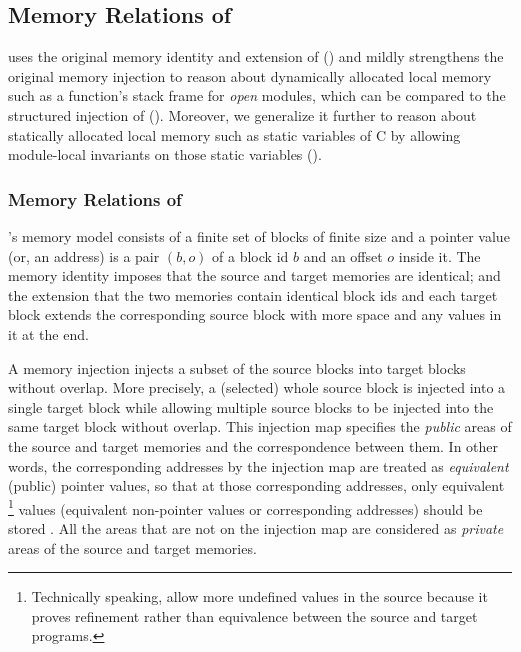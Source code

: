 {\revisioncmd
\subsection{Memory Relations of \ccm{}}
\label{sec:overview-verification:injection}

\ccm{} uses the original memory identity and extension of \cc{}
() and mildly
strengthens the original memory injection to reason about dynamically allocated
local memory such as a function's stack frame for \emph{open} modules,
which can be compared to the structured injection of \ccc{}
().
Moreover, we generalize it further to reason about statically allocated local memory
such as static variables of C by allowing module-local invariants on those static variables
().


\subsubsection{Memory Relations of \cc{}}
\label{sec:overview-verification:injection:original}
%
\cc{}'s memory model consists of a finite set of blocks of finite size
and a pointer value (or, an address) is a pair $(b,o)$ of a block id $b$ and an offset $o$ inside it.
The memory identity imposes that the source and target memories are identical;
and the extension that the two memories contain identical block ids and
each target block extends the corresponding source block
with more space and any values in it at the end.

A memory injection injects a subset of the source blocks into target blocks
without overlap. More precisely, a (selected) whole source block is injected into a single target block
while allowing multiple source blocks to be injected into the same target block without overlap.
This injection map specifies the \emph{public} areas of the source and target memories and the correspondence between them.
In other words, the corresponding addresses by the injection map are treated as \emph{equivalent} (public) pointer values,
so that at those corresponding addresses,
only equivalent%
\footnote{Technically speaking, \cc{} allow more undefined values in the source
  because it proves refinement rather than equivalence between the source and target programs.}
values (\ie equivalent non-pointer values or corresponding addresses) should be stored .
All the areas that are not on the injection map are considered as \emph{private} areas of the source and target memories.

}
